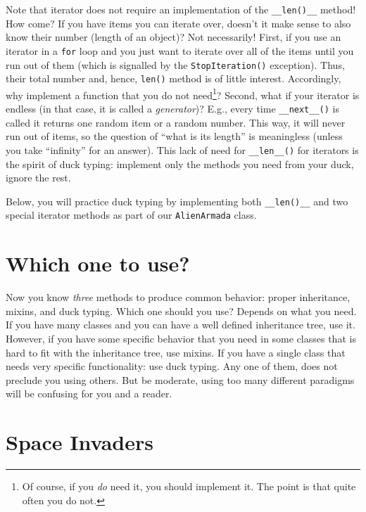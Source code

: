 \documentclass[
]{book}
\begin{document}
Note that iterator does not require an implementation of the \texttt{\_\_len()\_\_} method! How come? If you have items you can iterate over, doesn't it make sense to also know their number (length of an object)? Not necessarily! First, if you use an iterator in a \texttt{for} loop and you just want to iterate over all of the items until you run out of them (which is signalled by the \texttt{StopIteration()} exception). Thus, their total number and, hence, \texttt{len()} method is of little interest. Accordingly, why implement a function that you do not need\footnote{Of course, if you \emph{do} need it, you should implement it. The point is that quite often you do not.}? Second, what if your iterator is endless (in that case, it is called a \emph{generator})? E.g., every time \texttt{\_\_next\_\_()} is called it returns one random item or a random number. This way, it will never run out of items, so the question of ``what is its length'' is meaningless (unless you take ``infinity'' for an answer). This lack of need for \texttt{\_\_len\_\_()} for iterators is the spirit of duck typing: implement only the methods you need from your duck, ignore the rest.

Below, you will practice duck typing by implementing both \texttt{\_\_len()\_\_} and two special iterator methods as part of our \texttt{AlienArmada} class.

\hypertarget{which-one-to-use}{%
\section{Which one to use?}\label{which-one-to-use}}

Now you know \emph{three} methods to produce common behavior: proper inheritance, mixins, and duck typing. Which one should you use? Depends on what you need. If you have many classes and you can have a well defined inheritance tree, use it. However, if you have some specific behavior that you need in some classes that is hard to fit with the inheritance tree, use mixins. If you have a single class that needs very specific functionality: use duck typing. Any one of them, does not preclude you using others. But be moderate, using too many different paradigms will be confusing for you and a reader.

\hypertarget{space-invaders}{%
\section{Space Invaders}\label{space-invaders}}
\end{document}
